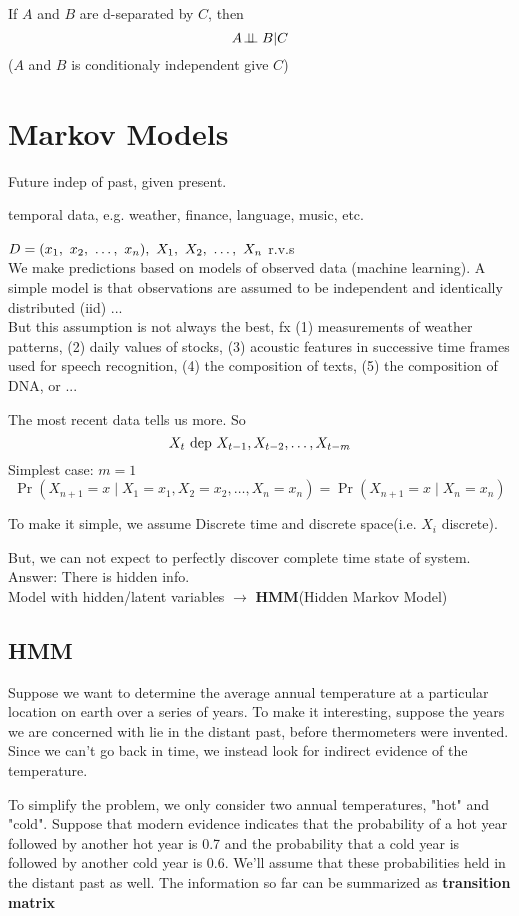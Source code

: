 \documentclass{article}
\begin{document}
\begin{theorem}
If $A$ and $B$ are d-separated by $C$, then 
$$A \!\perp\!\!\!\perp B | C$$
($A$ and $B$ is conditionaly independent give $C$)
\end{theorem}

\section{Markov Models}
Future indep of past, given present.

temporal data, e.g. weather, finance, language, music, etc.

$D = (x_1,~x_2,~\ldots,~x_n),\ X_1,~X_2,~\ldots,~X_n$ r.v.s \\
We make predictions based on models of observed data (machine learning). 
A simple model is that observations are assumed to be independent and identically distributed (iid) ...\\
But this assumption is not always the best, fx 
(1) measurements of weather patterns, 
(2) daily values of stocks, 
(3) acoustic features in successive time frames used for speech recognition, 
(4) the composition of texts, (5) the composition of DNA, or ...

The most recent data tells us more. So
$$X_t \text{ dep } X_{t-1}, X_{t-2}, \ldots, X_{t-m}$$
Simplest case: $m = 1$
$$
\Pr(X_{n+1}=x\mid X_1=x_1, X_2=x_2, \ldots, X_n=x_n) = \Pr(X_{n+1}=x\mid X_n=x_n)
$$

To make it simple, we assume Discrete time and discrete space(i.e. $X_i$ discrete).

\noindent
But, we can not expect to perfectly discover complete time state of system.\\
Answer: There is hidden info.\\
Model with hidden/latent variables $\rightarrow$ \textbf{HMM}(Hidden Markov Model)

\subsection{HMM}
Suppose we want to determine the average annual temperature at a particular location on
earth over a series of years. To make it interesting, suppose the years we are concerned with
lie in the distant past, before thermometers were invented. Since we can't go back in time,
we instead look for indirect evidence of the temperature.

To simplify the problem, we only consider two annual temperatures, "hot" and "cold".
Suppose that modern evidence indicates that the probability of a hot year followed by another
hot year is 0.7 and the probability that a cold year is followed by another cold year is 0.6.
We'll assume that these probabilities held in the distant past as well. The information so far can be summarized as \textbf{transition matrix}
\end{document}
